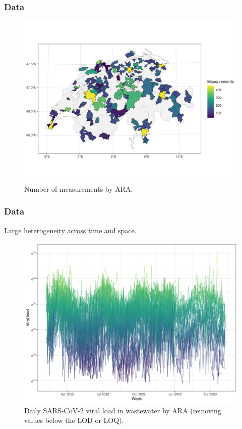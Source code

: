 \documentclass[10pt]{beamer}
\begin{document}
	\begin{frame}
		\frametitle{Data}
		\begin{figure}
			\includegraphics[width=.9\linewidth]{../reports/data_description_files/figure-html/map_missing-1}
			\vspace{-2em}
			\caption{Number of measurements by ARA.}
		\end{figure}
	\end{frame}
	
	\begin{frame}
		\frametitle{Data}
		
		Large \alert{heterogeneity} across time and space.
		\bigskip
		
		\begin{figure}
			\includegraphics[width=.75\linewidth]{../reports/data_description_files/figure-html/fig_vl2-1}
			\caption{Daily SARS-CoV-2 viral load in wastewater by ARA (removing values below the LOD or LOQ).}
		\end{figure}
	\end{frame}
	
\end{document}
